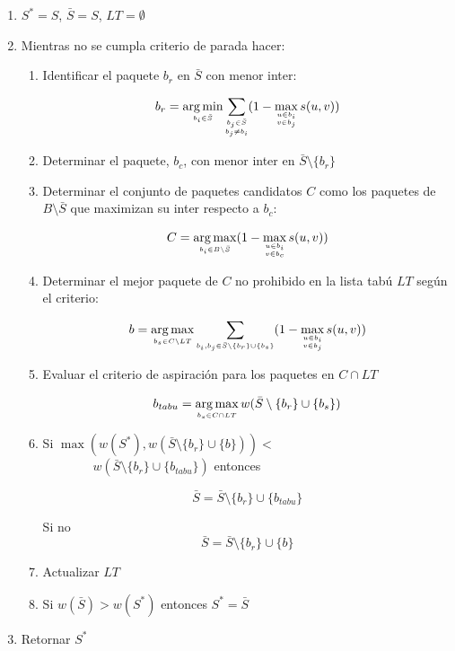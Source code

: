 \begin{enumerate}
\item $S^* = S$, $ \bar{S}= S$, $LT = \emptyset$

\item Mientras no se cumpla criterio de parada hacer:

\begin{enumerate}
      	
\item Identificar el paquete $b_r$ en $\bar{S}$ con menor inter:

$$b_r = \operatorname*{arg\,min}_{\scriptscriptstyle b_i \in \bar{S}} \sum_{\substack{\scriptscriptstyle  b_j \in \bar{S} \\ \scriptscriptstyle  b_j \ne b_i}} (1-\max_{\substack{\scriptscriptstyle  u\in b_i \\ \scriptscriptstyle v \in b_j}} s(u,v))$$

\item Determinar el paquete, $b_c$, con menor inter en $\bar{S} \setminus \{b_r\}$
	
\item Determinar el conjunto de paquetes candidatos $C$ como los paquetes de $B\setminus \bar{S}$ que maximizan su inter respecto a $b_c$:

$$C = \operatorname*{arg\,max}_{\scriptscriptstyle b_i \in B \setminus \bar{S}} (1-\max_{\substack{\scriptscriptstyle u\in b_i \\ \scriptscriptstyle v \in b_c}} s(u,v))$$

\item Determinar el mejor paquete de $C$ no prohibido en la lista tabú $LT$ según el criterio:

$$b = \operatorname*{arg\,max}_{\scriptscriptstyle b_s \in C \setminus LT} \sum_{\scriptscriptstyle b_i, b_j \in \bar{S}\setminus \{b_r\} \cup \{b_s\}}(1-\max_{\substack{\scriptscriptstyle u\in b_i \\ \scriptscriptstyle v \in b_j}} s(u,v))$$

\item Evaluar el criterio de aspiración para los paquetes en $C \cap LT$

$$b_{tabu} = \operatorname*{arg\,max}_{\scriptscriptstyle b_s \in C \cap LT} w(\bar{S} \setminus \{b_r\} \cup \{b_s\})$$

\item Si $\max(w(S^*),w(\bar{S} \setminus \{b_r\} \cup \{b\})) < \qquad \qquad$ $\qquad \qquad w(\bar{S} \setminus \{b_r\} \cup \{b_{tabu}\})$ entonces

$$\bar{S} = \bar{S} \setminus \{b_r\} \cup \{b_{tabu}\}$$ 

Si no $$\bar{S} = \bar{S} \setminus \{b_r\} \cup \{b\}$$

\item Actualizar $LT$

\item Si $w(\bar{S})>w(S^*)$ entonces $S^*=\bar{S}$

\end{enumerate}

\item Retornar $S^*$

\end{enumerate}

